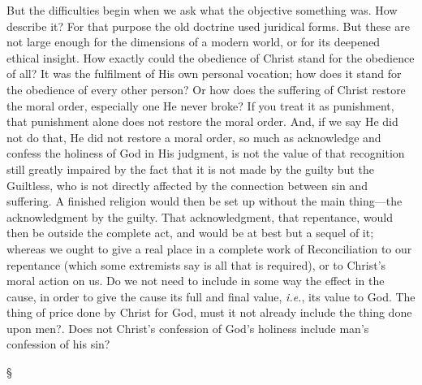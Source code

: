 \documentclass[12pt,letterpaper,oneside]{book}
\begin{document}
But the difficulties begin when we ask what 
the objective something was. How describe it? 
For that purpose the old doctrine used juridical 
forms. But these are not large enough for 
the dimensions of a modern world, or for its 
deepened ethical insight. How exactly could the 
obedience of Christ stand for the obedience of 
all? It was the fulfilment of His own personal 
vocation; how does it stand for the obedience 
of every other person? Or how does the suffering 
of Christ restore the moral order, especially 
one He never broke? If you treat it as punishment, 
that punishment alone does not restore 
the moral order. And, if we say He did not do 
that, He did not restore a moral order, so much 
as acknowledge and confess the holiness of God 
in His judgment, is not the value of that recognition 
still greatly impaired by the fact that it 
is not made by the guilty but the Guiltless, who 
is not directly affected by the connection between 
sin and suffering. A finished religion 
would then be set up without the main thing---the 
acknowledgment by the guilty. That acknowledgment, 
that repentance, would then be 
outside the complete act, and would be at best 
but a sequel of it; whereas we ought to give 
a real place in a complete work of Reconciliation 
to our repentance (which some extremists say is 
all that is required), or to Christ's moral action 
on us. Do we not need to include in some way 
the effect in the cause, in order to give the cause 
its full and final value, \textit{i.e.}, its value to God. 
The thing of price done by Christ for God, must 
it not already include the thing done upon men?. 
Does not Christ's confession of God's holiness 
include man's confession of his sin? 

\begin{center}
\S
\end{center}
\end{document}
